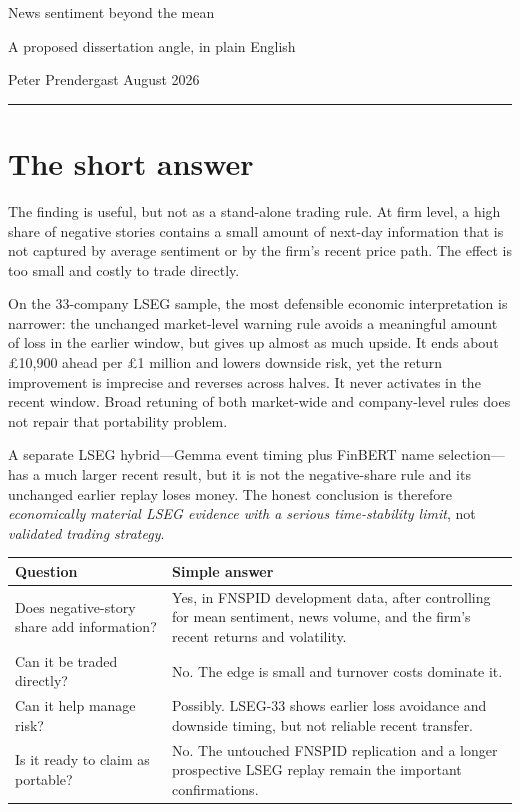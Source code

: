 \documentclass[11pt,a4paper]{article}
\begin{document}
{\LARGE News sentiment beyond the mean}

{\large A proposed dissertation angle, in plain English}

Peter Prendergast \quad \textperiodcentered {} August 2026

\vspace{0.8em}
\hrule
\vspace{1em}

\section*{The short answer}

The finding is useful, but not as a stand-alone trading rule. At firm level, a high share of negative stories contains a small amount of next-day information that is not captured by average sentiment or by the firm's recent price path. The effect is too small and costly to trade directly.

On the 33-company LSEG sample, the most defensible economic interpretation is narrower: the unchanged market-level warning rule avoids a meaningful amount of loss in the earlier window, but gives up almost as much upside. It ends about \pounds10{,}900 ahead per \pounds1 million and lowers downside risk, yet the return improvement is imprecise and reverses across halves. It never activates in the recent window. Broad retuning of both market-wide and company-level rules does not repair that portability problem.

A separate LSEG hybrid---Gemma event timing plus FinBERT name selection---has a much larger recent result, but it is not the negative-share rule and its unchanged earlier replay loses money. The honest conclusion is therefore \emph{economically material LSEG evidence with a serious time-stability limit}, not \emph{validated trading strategy}.

\begin{table}[H]
\centering
\begin{tabularx}{\textwidth}{p{} X}
\toprule
Question & Simple answer \\
\midrule
Does negative-story share add information? & Yes, in FNSPID development data, after controlling for mean sentiment, news volume, and the firm's recent returns and volatility. \\
Can it be traded directly? & No. The edge is small and turnover costs dominate it. \\
Can it help manage risk? & Possibly. LSEG-33 shows earlier loss avoidance and downside timing, but not reliable recent transfer. \\
Is it ready to claim as portable? & No. The untouched FNSPID replication and a longer prospective LSEG replay remain the important confirmations. \\
\bottomrule
\end{tabularx}
\end{table}
\end{document}

